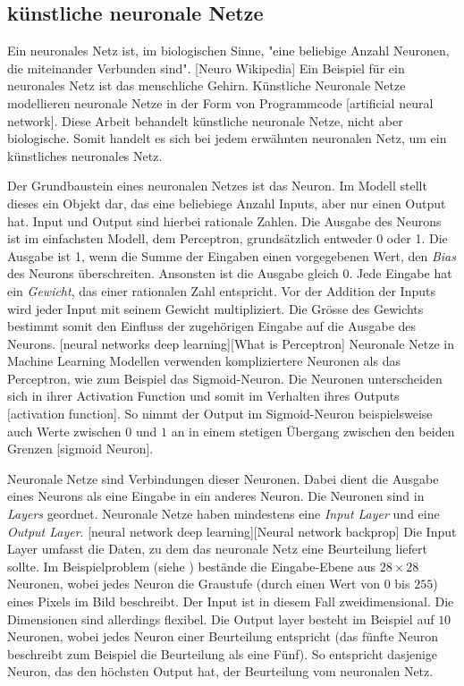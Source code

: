 \subsection{künstliche neuronale Netze}

Ein neuronales Netz ist, im biologischen Sinne, "eine beliebige Anzahl Neuronen,
die miteinander Verbunden sind". [Neuro Wikipedia] Ein Beispiel für ein
neuronales Netz ist das menschliche Gehirn. Künstliche Neuronale Netze
modellieren neuronale Netze in der Form von Programmcode [artificial neural
network]. Diese Arbeit behandelt künstliche neuronale Netze, nicht aber
biologische. Somit handelt es sich bei jedem erwähnten neuronalen Netz, um ein
künstliches neuronales Netz.

Der Grundbaustein eines neuronalen Netzes ist das Neuron. Im Modell stellt
dieses ein Objekt dar, das eine beliebiege Anzahl Inputs, aber nur einen Output
hat. Input und Output sind hierbei rationale Zahlen. Die Ausgabe des Neurons ist
im einfachsten Modell, dem Perceptron, grundsätzlich entweder 0 oder 1. Die
Ausgabe ist 1, wenn die Summe der Eingaben einen vorgegebenen Wert, den
\emph{Bias} des Neurons überschreiten. Ansonsten ist die Ausgabe gleich 0. Jede
Eingabe hat ein \emph{Gewicht}, das einer rationalen Zahl entspricht. Vor der
Addition der Inputs wird jeder Input mit seinem Gewicht multipliziert.  Die
Grösse des Gewichts bestimmt somit den Einfluss der zugehörigen Eingabe auf die
Ausgabe des Neurons. [neural networks deep learning][What is Perceptron]
Neuronale Netze in Machine Learning Modellen verwenden kompliziertere Neuronen
als das Perceptron, wie zum Beispiel das Sigmoid-Neuron. Die Neuronen
unterscheiden sich in ihrer Activation Function und somit im Verhalten ihres
Outputs [activation function]. So nimmt der Output im Sigmoid-Neuron
beispielsweise auch Werte zwischen $0$ und $1$ an in einem stetigen Übergang
zwischen den beiden Grenzen [sigmoid Neuron].


Neuronale Netze sind Verbindungen dieser Neuronen. Dabei dient die Ausgabe eines
Neurons als eine Eingabe in ein anderes Neuron. Die Neuronen sind in
\emph{Layers} geordnet. Neuronale Netze haben mindestens eine \emph{Input Layer}
und eine \emph{Output Layer}. [neural network deep learning][Neural network
backprop] Die Input Layer umfasst die Daten, zu dem das neuronale Netz eine
Beurteilung liefert sollte. Im Beispielproblem (siehe )
bestände die Eingabe-Ebene aus $28\times28$ Neuronen, wobei jedes Neuron die
Graustufe (durch einen Wert von $0$ bis $255$) eines Pixels im Bild beschreibt.
Der Input ist in diesem Fall zweidimensional. Die Dimensionen sind allerdings
flexibel. Die Output layer besteht im Beispiel auf $10$ Neuronen, wobei jedes
Neuron einer Beurteilung entspricht (das fünfte Neuron beschreibt zum Beispiel
die Beurteilung als eine Fünf). So entspricht dasjenige Neuron, das den höchsten
Output hat, der Beurteilung vom neuronalen Netz.

